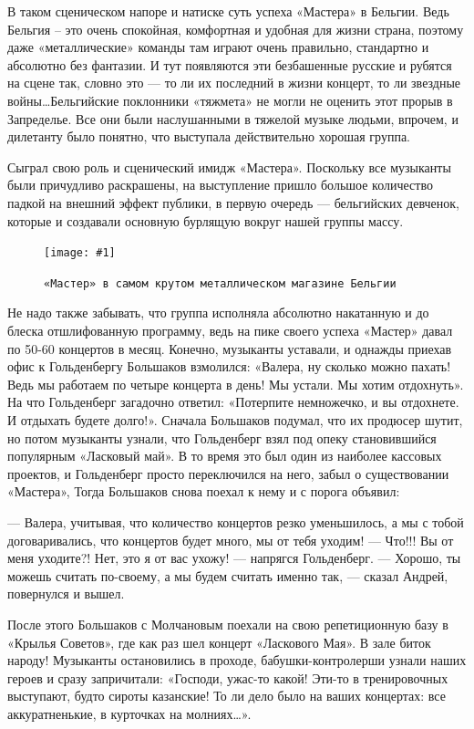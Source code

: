 \documentclass[10pt, twoside]{book}
\newcommand{\myincludegraphics}[1]{\texttt{[image: \#1]}}
\begin{document}
В таком сценическом напоре и натиске суть успеха «Мастера» в Бельгии. Ведь Бельгия – это очень спокойная, комфортная и
удобная для жизни страна, поэтому даже «металлические» команды там играют очень правильно, стандартно и абсолютно без
фантазии. И тут появляются эти безбашенные русские и рубятся на сцене так, словно это — то ли их последний в жизни
концерт, то ли звездные войны\ldots Бельгийские поклонники «тяжмета» не могли не оценить этот прорыв в Запределье. Все
они были наслушанными в тяжелой музыке людьми, впрочем, и дилетанту было понятно, что выступала действительно хорошая
группа.

Сыграл свою роль и сценический имидж «Мастера». Поскольку все музыканты были причудливо раскрашены, на выступление
пришло большое количество падкой на внешний эффект публики, в первую очередь — бельгийских девченок, которые и создавали
основную бурлящую вокруг нашей группы массу.

\begin{figure}[h]
    \centering
    \myincludegraphics{Image24}
    \caption{\texttt{«Мастер» в самом крутом металлическом магазине Бельгии}}
\end{figure}

Не надо также забывать, что группа исполняла абсолютно накатанную и до блеска отшлифованную программу, ведь на пике
своего успеха «Мастер» давал по 50-60 концертов в месяц. Конечно, музыканты уставали, и однажды приехав офис к
Гольденбергу Большаков взмолился: «Валера, ну сколько можно пахать! Ведь мы работаем по четыре концерта в день! Мы
устали. Мы хотим отдохнуть». На что Гольденберг загадочно ответил: «Потерпите немножечко, и вы отдохнете. И отдыхать
будете долго!». Сначала Большаков подумал, что их продюсер шутит, но потом музыканты узнали, что Гольденберг взял под
опеку становившийся популярным «Ласковый май». В то время это был один из наиболее кассовых проектов, и Гольденберг
просто переключился на него, забыл о существовании «Мастера», Тогда Большаков снова поехал к нему и с порога объявил:

— Валера, учитывая, что количество концертов резко уменьшилось, а мы с тобой договаривались, что концертов будет много,
мы от тебя уходим!
— Что!!! Вы от меня уходите?! Нет, это я от вас ухожу! — напрягся Гольденберг.
— Хорошо, ты можешь считать по-своему, а мы будем считать именно так, — сказал Андрей, повернулся и вышел.

После этого Большаков с Молчановым поехали на свою репетиционную базу в «Крылья Советов», где как раз шел концерт
«Ласкового Мая». В зале биток народу! Музыканты остановились в проходе, бабушки-контролерши узнали наших героев и сразу
запричитали: «Господи, ужас-то какой! Эти-то в тренировочных выступают, будто сироты казанские! То ли дело было на ваших
концертах: все аккуратненькие, в курточках на молниях\ldots».
\end{document}

